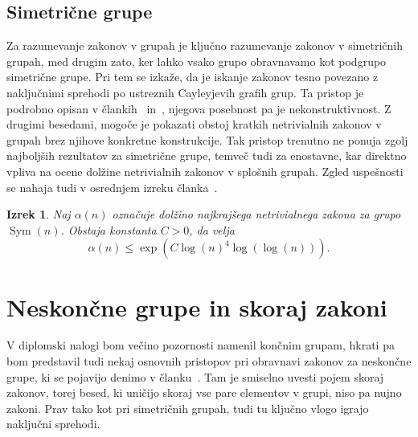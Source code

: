\documentclass[12pt,a4paper]{article}
\newcounter{theoremcounter}[section] %
\newtheorem{izrek}[theoremcounter]{Izrek}
\begin{document}
\subsection{Simetrične grupe}
Za razumevanje zakonov v grupah je ključno razumevanje zakonov v simetričnih grupah, med drugim zato, ker lahko vsako grupo obravnavamo kot podgrupo simetrične grupe. Pri tem se izkaže, da je iskanje zakonov tesno povezano z naključnimi sprehodi po ustreznih Cayleyjevih grafih grup.
Ta pristop je podrobno opisan v člankih~\cite{Amir_Blachar_Gerasimova_Kozma_2023} in~\cite{Kozma_Thom_2016}, njegova posebnost pa je nekonstruktivnost. Z drugimi besedami, mogoče je pokazati
obstoj kratkih netrivialnih zakonov v grupah brez njihove konkretne konstrukcije. Tak pristop trenutno ne ponuja zgolj najboljših rezultatov za simetrične grupe, temveč tudi za enostavne, kar direktno vpliva
na ocene dolžine netrivialnih zakonov v splošnih grupah. Zgled uspešnosti se nahaja tudi v osrednjem izreku članka~\cite{Kozma_Thom_2016}.
\begin{izrek}
Naj $\alpha(n)$ označuje dolžino najkrajšega netrivialnega zakona za grupo $\operatorname{Sym}(n)$. Obstaja konstanta $C > 0$, da velja \begin{equation*}
\alpha(n) \le  \exp \left( C \log(n)^{4} \log(\log(n)) \right).
\end{equation*}  
\end{izrek}


\section{Neskončne grupe in skoraj zakoni}
V diplomski nalogi bom večino pozornosti namenil končnim grupam, hkrati pa bom predstavil tudi nekaj osnovnih pristopov pri obravnavi zakonov za neskončne grupe, ki se pojavijo denimo v članku~\cite{Amir_Blachar_Gerasimova_Kozma_2023}.  
Tam je smiselno uvesti pojem skoraj zakonov, torej besed, ki uničijo skoraj vse pare elementov v grupi, niso pa nujno zakoni. Prav tako kot pri simetričnih grupah, tudi tu ključno vlogo igrajo naključni sprehodi.  



\end{document}

